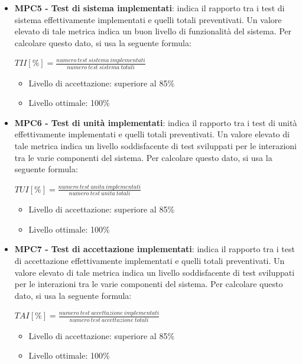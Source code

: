 \documentclass[11pt,a4paper]{article}
\begin{document}
{\begin{itemize}
	\begin{center}
		$TII[\%]=\frac{numero\ test\ integrazione\ implementati}{numero\ test\ integrazione\ totali}$
	\end{center}
	\begin{itemize}
	 \item Livello di accettazione: superiore al 85\%
	 \item Livello ottimale: 100\%
	 \end{itemize}
	\item \textbf{MPC5 - Test di sistema implementati}: indica il rapporto tra i test di sistema effettivamente implementati e quelli totali preventivati. Un valore elevato di tale metrica indica un buon livello di funzionalità del sistema. Per calcolare questo dato, si usa la seguente formula:
	\begin{center}
		$TII[\%]=\frac{numero\ test\ sistema\ implementati}{numero\ test\ sistema\ totali}$
	\end{center}
	\begin{itemize}
	 \item Livello di accettazione: superiore al 85\%
	 \item Livello ottimale: 100\%
	 \end{itemize}
	\item \textbf{MPC6 - Test di unità implementati}: indica il rapporto tra i test di unità effettivamente implementati e quelli totali preventivati. Un valore elevato di tale metrica indica un livello soddisfacente di test sviluppati per le interazioni tra le varie componenti del sistema. Per calcolare questo dato, si usa la seguente formula: 
	\begin{center}
		$TUI[\%]=\frac{numero\ test\ unita\ implementati}{numero\ test\ unita\ totali}$
	\end{center}
	\begin{itemize}
	 \item Livello di accettazione: superiore al 85\%
	 \item Livello ottimale: 100\%
	 \end{itemize}
	\item \textbf{MPC7 - Test di accettazione implementati}: indica il rapporto tra i test di accettazione effettivamente implementati e quelli totali preventivati. Un valore elevato di tale metrica indica un livello soddisfacente di test sviluppati per le interazioni tra le varie componenti del sistema. Per calcolare questo dato, si usa la seguente formula: 
	\begin{center}
		$TAI[\%]=\frac{numero\ test\ accettazione\ implementati}{numero\ test\ accettazione\ totali}$
	\end{center}
	\begin{itemize}
	 \item Livello di accettazione: superiore al 85\%
	 \item Livello ottimale: 100\%
	 \end{itemize}
	\end{itemize}
	
}
\end{document}
